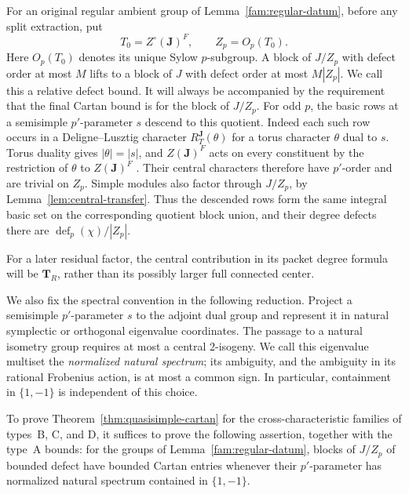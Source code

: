 For an original regular ambient group of
Lemma~\ref{fam:regular-datum}, before any split extraction, put
\[
 T_0=Z^\circ(\mathbf J)^F,\qquad Z_p=O_p(T_0).
\]
Here \(O_p(T_0)\) denotes its unique Sylow \(p\)-subgroup.  A block
of \(J/Z_p\) with defect order at most \(M\) lifts to a block of
\(J\) with defect order at most \(M|Z_p|\).  We call this a relative
defect bound.  It will always be accompanied by the requirement
that the final Cartan bound is for the block of \(J/Z_p\).
For odd \(p\), the basic rows at a semisimple \(p'\)-parameter
\(s\) descend to this quotient.  Indeed each such row occurs in
a Deligne--Lusztig character \(R_T^{\mathbf J}(\theta)\) for a torus
character \(\theta\) dual to \(s\).  Torus duality gives
\(|\theta|=|s|\), and \(Z(\mathbf J)^F\) acts on every constituent
by the restriction of \(\theta\) to \(Z(\mathbf J)^F\)
\cite[Corollary~1.22 and Section~5.21]{DL}.
Their central characters therefore have \(p'\)-order and are trivial
on \(Z_p\).  Simple modules also factor through \(J/Z_p\), by
Lemma~\ref{lem:central-transfer}.  Thus the descended rows form the
same integral basic set on the corresponding quotient block union,
and their degree defects there are
\(\operatorname{def}_p(\chi)/|Z_p|\).

For a later residual factor, the central contribution in its
packet degree formula will be \(\mathbf T_R\), rather than its
possibly larger full connected center.

We also fix the spectral convention in the following reduction.
Project a semisimple \(p'\)-parameter \(s\) to the adjoint dual
group and represent it in natural symplectic or orthogonal
eigenvalue coordinates.  The passage to a natural isometry group
requires at most a central 2-isogeny.  We call this eigenvalue
multiset the \emph{normalized natural spectrum}; its ambiguity,
and the ambiguity in its rational Frobenius action, is at most a
common sign.  In particular, containment in \(\{1,-1\}\) is
independent of this choice.

\begin{proposition}\label{fam:central-classical}
To prove Theorem~\ref{thm:quasisimple-cartan} for the
cross-characteristic families of types~B, C, and D, it suffices to
prove the following assertion, together with the type~A bounds:
for the groups of Lemma~\ref{fam:regular-datum}, blocks of
\(J/Z_p\) of bounded defect have bounded Cartan entries whenever
their \(p'\)-parameter has normalized natural spectrum contained
in \(\{1,-1\}\).
\end{proposition}

